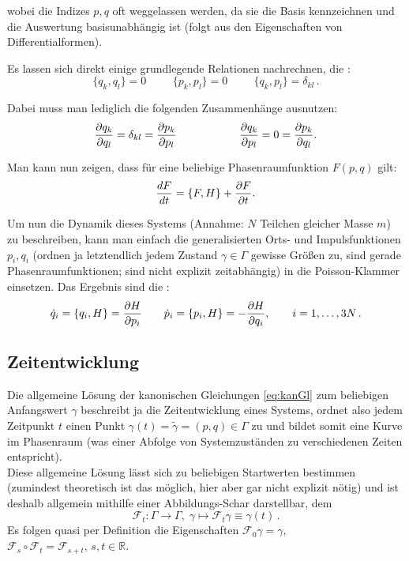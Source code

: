 \documentclass[../KlassMech_main.tex]{subfiles}
\begin{document}
wobei die Indizes $p,q$ oft weggelassen werden, da sie die Basis kennzeichnen und die Auswertung basisunabhängig ist (folgt aus den Eigenschaften von Differentialformen).

Es lassen sich direkt einige grundlegende Relationen nachrechnen, die :
\begin{equation}
\{q_k, q_l\} = 0 \hspace{1cm} \{p_k, p_l\} = 0 \hspace{1cm} \{q_k, p_l\} = \delta_{kl} \, .
\end{equation}

Dabei muss man lediglich die folgenden Zusammenhänge ausnutzen:
\begin{equation}
\pdv{q_k}{q_l} = \delta_{kl} = \pdv{p_k}{p_l} \hspace{2cm} \pdv{q_k}{p_l} = 0 = \pdv{p_k}{q_l} .
\end{equation}

Man kann nun zeigen, dass für eine beliebige Phasenraumfunktion $F(p,q)$ gilt:
\begin{equation}
\dv{F}{t} = \qty{F,H} + \pdv{F}{t} .
\end{equation}

Um nun die Dynamik dieses Systems (Annahme: $N$ Teilchen gleicher Masse $m$) zu beschreiben, kann man einfach die generalisierten Orts- und Impulsfunktionen $p_i, q_i$ (ordnen ja letztendlich jedem Zustand $\gamma \in \Gamma$ gewisse Größen zu, sind gerade Phasenraumfunktionen; sind nicht explizit zeitabhängig) in die Poisson-Klammer einsetzen. Das Ergebnis sind die :
\begin{equation}\label{eq:kanGl}
\dot{q}_i = \qty{q_i, H} = \pdv{H}{p_i} \qquad \dot{p}_i = \qty{p_i, H} = -\pdv{H}{q_i}, \qquad i = 1, \dots, 3N \, .
\end{equation}



	\subsection{Zeitentwicklung}
Die allgemeine Lösung der kanonischen Gleichungen \eqref{eq:kanGl} zum beliebigen Anfangswert $\gamma$ beschreibt ja die Zeitentwicklung eines Systems, ordnet also jedem Zeitpunkt $t$ einen Punkt $\gamma(t) = \tilde{\gamma} = (p,q) \in \Gamma$ zu und bildet somit eine Kurve im Phasenraum (was einer Abfolge von Systemzuständen zu verschiedenen Zeiten entspricht).\\
Diese allgemeine Lösung lässt sich zu beliebigen Startwerten bestimmen (zumindest theoretisch ist das möglich, hier aber gar nicht explizit nötig) und ist deshalb allgemein mithilfe einer Abbildungs-Schar darstellbar, dem 
\begin{equation}
\mathcal{F}_t : \Gamma \rightarrow \Gamma, \; \gamma \mapsto \mathcal{F}_t \gamma \equiv \gamma(t) \, .
\end{equation}
Es folgen quasi per Definition die Eigenschaften $\mathcal{F}_0 \gamma = \gamma$, $\mathcal{F}_s \circ \mathcal{F}_t = \mathcal{F}_{s+t}, \, s,t \in \mathbb{R}$.
\end{document}
